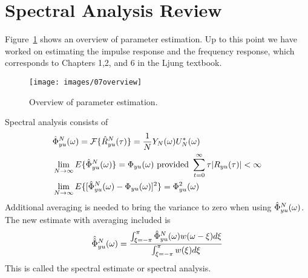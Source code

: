 \mainmatter%
\setcounter{page}{1}

\lectureseries[\course]{\course}

\date{October 15, 2009}

\setaddress%

\setcounter{lecture}{6}
\setcounter{chapter}{6}

\label{lec:7}

\section{Spectral Analysis Review}
Figure~\ref{fig:07overview} shows an overview of parameter estimation.
Up to this point we have worked on estimating the impulse response and the frequency response, which corresponds to Chapters 1,2, and 6 in the Ljung textbook.

\begin{figure}[ht!]
\centering
\texttt{[image: images/07overview]}
\caption{Overview of parameter estimation.}
\label{fig:07overview}
\end{figure}

Spectral analysis consists of
\begin{align*}
&\phiyuhat = \mathcal{F}\{\ryuhat\} = \frac{1}{N}Y_N(\w)U_N^*(\w) \\
&\lim_{N\to\infty}E\{\phiyuhat\} = \Phi_{yu}(\w) \text{~provided~} \sum_{t=0}^\infty \tau|R_{yu}(\tau)| < \infty \\
&\lim_{N\to\infty}E\{[\phiyuhat - \Phi_{yu}(\w)]^2\} = \Phi_{yu}^2(\w)%
\end{align*}
Additional averaging is needed to bring the variance to zero when using $\hat{\Phi}_{yu}^N (\omega)$.
The new estimate with averaging included is
$$\hat{\hat{\Phi}}_{yu}^N (\omega) = \frac{\int_{\xi=-\pi}^\pi \hat{\Phi}_{yu}^N (\omega) w(\omega-\xi)d\xi}{\int_{\xi=-\pi}^\pi w(\xi)d\xi}$$
This is called the spectral estimate or spectral analysis.

